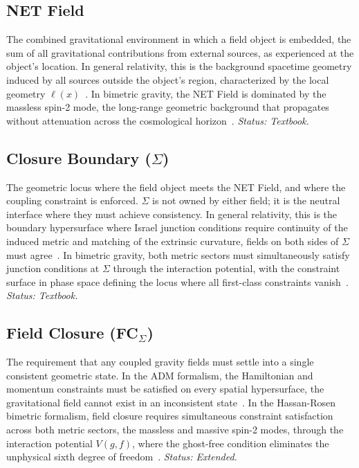 \documentclass[aps,prd,preprint,superscriptaddress,showpacs,preprintnumbers,amsmath,amssymb,nofootinbib]{revtex4-2}
\begin{document}
\subsection*{NET Field}

The combined gravitational environment in which a field object is embedded, the sum of all gravitational contributions from external sources, as experienced at the object's location. In general relativity, this is the background spacetime geometry induced by all sources outside the object's region, characterized by the local geometry $\ell(x)$~\cite{mtw1973}. In bimetric gravity, the NET Field is dominated by the massless spin-2 mode, the long-range geometric background that propagates without attenuation across the cosmological horizon~\cite{hassan2012}. \emph{Status: Textbook.}

\subsection*{Closure Boundary ($\Sigma$)}

The geometric locus where the field object meets the NET Field, and where the coupling constraint is enforced. $\Sigma$ is not owned by either field; it is the neutral interface where they must achieve consistency. In general relativity, this is the boundary hypersurface where Israel junction conditions require continuity of the induced metric and matching of the extrinsic curvature, fields on both sides of $\Sigma$ must agree~\cite{israel1966,mtw1973}. In bimetric gravity, both metric sectors must simultaneously satisfy junction conditions at $\Sigma$ through the interaction potential, with the constraint surface in phase space defining the locus where all first-class constraints vanish~\cite{hassan2012,dirac1964}. \emph{Status: Textbook.}

\subsection*{Field Closure (FC$_{\Sigma}$)}

The requirement that any coupled gravity fields must settle into a single consistent geometric state. In the ADM formalism, the Hamiltonian and momentum constraints must be satisfied on every spatial hypersurface, the gravitational field cannot exist in an inconsistent state~\cite{adm1962}. In the Hassan-Rosen bimetric formalism, field closure requires simultaneous constraint satisfaction across both metric sectors, the massless and massive spin-2 modes, through the interaction potential $V(g,f)$, where the ghost-free condition eliminates the unphysical sixth degree of freedom~\cite{hassan2012}. \emph{Status: Extended.}
\end{document}
